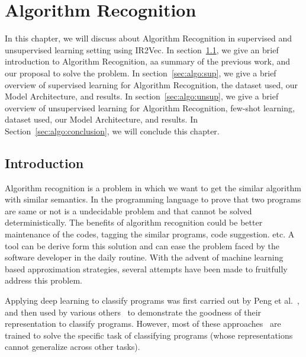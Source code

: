 \chapter{Algorithm Recognition}
\label{chap:ch3}

In this chapter, we will discuss about Algorithm Recognition in supervised and unsupervised learning setting using IR2Vec. 
In section~\ref{sec:algo:intro}, we give an brief introduction to Algorithm Recognition, aa summary of the previous work, and our proposal to solve the problem. 
In section~\ref{sec:algo:sup}, we give a brief overview of supervised learning for Algorithm Recognition, the dataset used, our Model Architecture, and results. 
In section~\ref{sec:algo:unsup}, we give a brief overview of unsupervised learning for Algorithm Recognition, few-shot learning, dataset used, our Model Architecture, and results. 
In Section~\ref{sec:algo:conclusion}, we will conclude this chapter.


\section{Introduction}\label{sec:algo:intro}
Algorithm recognition is a problem in which we want to get the similar algorithm with similar semantics. In the programming language to prove that two programs are same or not is a undecidable problem and that cannot be solved deterministically. The benefits of algorithm recognition could be better maintenance of the codes, tagging the similar programs, code suggestion. etc.   A tool can be derive form this solution and can ease the problem faced by the software developer in the daily routine. With the advent of machine learning based approximation strategies, several attempts have been made to fruitfully address this problem.


Applying deep learning to classify programs was first carried out by Peng et al.~\cite{Peng:2015}, and then used by various others~\cite{tbcnn-aaai16,ncc,Chen:2019} to demonstrate the goodness of their representation to classify programs. 
However, most of these approaches~\cite{Peng:2015,tbcnn-aaai16,Chen:2019} are trained to solve the specific task of classifying programs (whose representations cannot generalize across other tasks).


